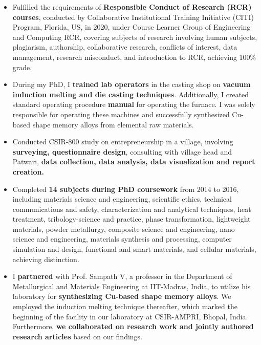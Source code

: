 \begin{cvparagraph}
\begin{itemize}
    \item \textcolor{russell}{Fulfilled the requirements of \textbf{Responsible Conduct of Research (RCR) courses}, conducted by Collaborative Institutional Training Initiative (CITI) Program, Florida, US, in 2020, under Course Learner Group of Engineering and Computing RCR, covering subjects of research involving human subjects, plagiarism,  authorship, collaborative research, conflicts of interest, data management, research misconduct, and introduction to RCR, achieving 100\% grade.}
    \item \textcolor{russell}{During my PhD, I \textbf{trained lab operators} in the casting shop on \textbf{vacuum induction melting and die casting techniques}. Additionally, I created standard operating procedure \textbf{manual} for operating the furnace. I was solely responsible for operating these machines and successfully synthesized Cu-based shape memory alloys from elemental raw materials.}
    \item \textcolor{russell}{Conducted CSIR-800 study on entrepreneurship in a village, involving \textbf{surveying, questionnaire design}, consulting with village head and Patwari, \textbf{data collection, data analysis, data visualization and report creation.}}
    \item \textcolor{russell}{Completed \textbf{14 subjects during PhD coursework} from 2014 to 2016, including materials science and engineering, scientific ethics, technical communications and safety, characterization and analytical techniques, heat treatment, tribology-science and practice, phase transformation, lightweight materials, powder metallurgy, composite science and engineering, nano science and engineering, materials synthesis and processing, computer simulation and design, functional and smart materials, and cellular materials, achieving distinction.}
    \item \textcolor{russell}{I \textbf{partnered} with Prof. Sampath V, a professor in the Department of Metallurgical and Materials Engineering at IIT-Madras, India, to utilize his laboratory for \textbf{synthesizing Cu-based shape memory alloys}. We employed the induction melting technique thereafter, which marked the beginning of the facility in our laboratory at CSIR-AMPRI, Bhopal, India. Furthermore, \textbf{we collaborated on research work and jointly authored research articles} based on our findings.}
\end{itemize}
\end{cvparagraph}